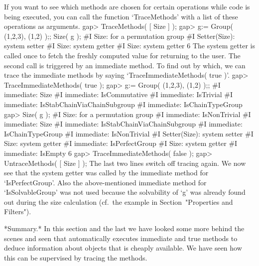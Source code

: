 If you want to see which methods  are chosen for certain operations while
{\GAP}  code is being executed,  you can call the function `TraceMethods'
with a list of these operations as arguments.
\beginexample
gap> TraceMethods( [ Size ] );
gap> g:= Group( (1,2,3), (1,2) );;  Size( g );
#I  Size: for a permutation group
#I  Setter(Size): system setter
#I  Size: system getter
#I  Size: system getter
6
\endexample
The system getter is called once to fetch  the freshly computed value for
returning  to the user.  The  second  call is  triggered by  an immediate
method. To  find out  by which,  we can trace   the immediate  methods by
saying `TraceImmediateMethods( true )'.
\beginexample
gap> TraceImmediateMethods( true );
gap> g:= Group( (1,2,3), (1,2) );;
#I  immediate: Size
#I  immediate: IsCommutative
#I  immediate: IsTrivial
#I  immediate: IsStabChainViaChainSubgroup
#I  immediate: IsChainTypeGroup
gap> Size( g );
#I  Size: for a permutation group
#I  immediate: IsNonTrivial
#I  immediate: Size
#I  immediate: IsStabChainViaChainSubgroup
#I  immediate: IsChainTypeGroup
#I  immediate: IsNonTrivial
#I  Setter(Size): system setter
#I  Size: system getter
#I  immediate: IsPerfectGroup
#I  Size: system getter
#I  immediate: IsEmpty
6
gap> TraceImmediateMethods( false );
gap> UntraceMethods( [ Size ] );
\endexample
The last two lines switch off tracing  again. We now  see that the system
getter was called by the immediate method for `IsPerfectGroup'. 
Also the above-mentioned immediate method for `IsSolvableGroup'
was not used because the solvability of `g'  was already found out during
the size calculation
(cf.~the example in Section~"Properties and Filters").

*Summary.*  In this section  and the  last we have  looked some  more
behind the  scenes and seen  that {\GAP} automatically executes immediate
and true  methods  to deduce  information about  objects  that is cheaply
available.  We  have seen how   this  can be  supervised  by tracing  the
methods.


